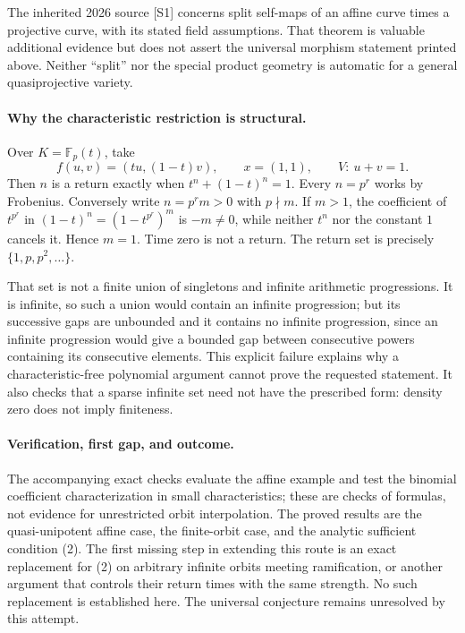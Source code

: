 \documentclass[11pt]{article}
\begin{document}
The inherited 2026 source [S1] concerns split self-maps of an affine curve times a projective curve, with its stated field assumptions. That theorem is valuable additional evidence but does not assert the universal morphism statement printed above. Neither ``split'' nor the special product geometry is automatic for a general quasiprojective variety.

\paragraph{Why the characteristic restriction is structural.}
Over $K=\mathbb F_p(t)$, take
\[
 f(u,v)=(tu,(1-t)v),\qquad x=(1,1),\qquad V:\ u+v=1.
\]
Then $n$ is a return exactly when $t^n+(1-t)^n=1$. Every $n=p^r$ works by Frobenius. Conversely write $n=p^r m>0$ with $p\nmid m$. If $m>1$, the coefficient of $t^{p^r}$ in $(1-t)^n=(1-t^{p^r})^m$ is $-m\ne0$, while neither $t^n$ nor the constant $1$ cancels it. Hence $m=1$. Time zero is not a return. The return set is precisely $\{1,p,p^2,\ldots\}$.

That set is not a finite union of singletons and infinite arithmetic progressions. It is infinite, so such a union would contain an infinite progression; but its successive gaps are unbounded and it contains no infinite progression, since an infinite progression would give a bounded gap between consecutive powers containing its consecutive elements. This explicit failure explains why a characteristic-free polynomial argument cannot prove the requested statement. It also checks that a sparse infinite set need not have the prescribed form: density zero does not imply finiteness.

\paragraph{Verification, first gap, and outcome.}
The accompanying exact checks evaluate the affine example and test the binomial coefficient characterization in small characteristics; these are checks of formulas, not evidence for unrestricted orbit interpolation. The proved results are the quasi-unipotent affine case, the finite-orbit case, and the analytic sufficient condition (2). The first missing step in extending this route is an exact replacement for (2) on arbitrary infinite orbits meeting ramification, or another argument that controls their return times with the same strength. No such replacement is established here. The universal conjecture remains unresolved by this attempt.
\end{document}
